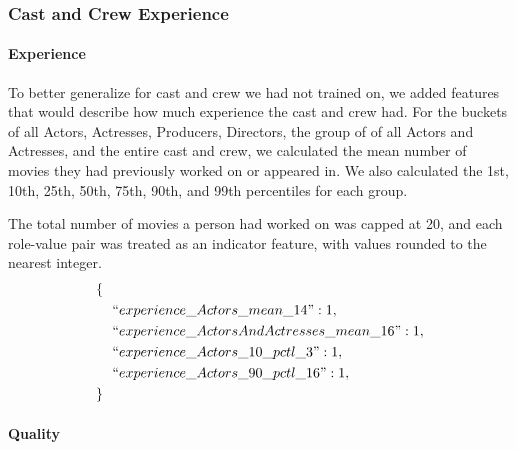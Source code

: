 \documentclass[journal]{IEEEtran}
\begin{document}
\subsubsection{Cast and Crew Experience}
\paragraph{Experience}

To better generalize for cast and crew we had not trained on, we added features that would describe how much experience the cast and crew had.  For the buckets of all Actors, Actresses, Producers, Directors, the group of of all Actors and Actresses, and the entire cast and crew, we calculated the mean number of movies they had previously worked on or appeared in.  We also calculated the 1st, 10th, 25th, 50th, 75th, 90th, and 99th percentiles for each group.
\begin{center}
\end{center}

The total number of movies a person had worked on was capped at 20, and each role-value pair was treated as an indicator feature, with values rounded to the nearest integer.
\begin{align*}
        \{\ \ &\\
        &``experience\_Actors\_mean\_14": 1,\\
        &``experience\_ActorsAndActresses\_mean\_16": 1,\\
        &``experience\_Actors\_10\_pctl\_3": 1,\\
        &``experience\_Actors\_90\_pctl\_16": 1,\\
        \}\ \ &
\end{align*}

\paragraph{Quality}
\end{document}
